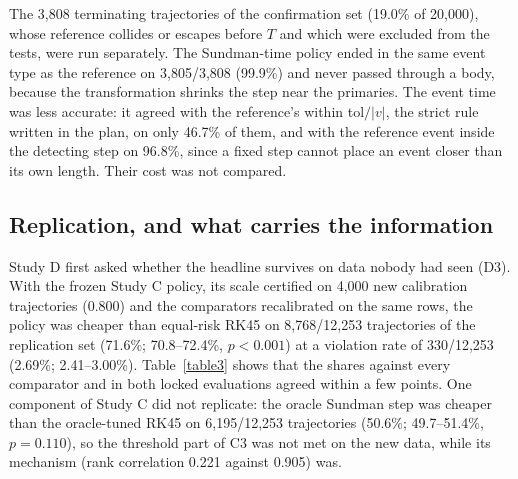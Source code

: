 \documentclass[10pt,letterpaper]{article}
\begin{document}
The 3,808 terminating trajectories of the confirmation set (19.0\% of 20,000), whose reference collides or escapes before $T$ and which were excluded from the tests, were run separately. The Sundman-time policy ended in the same event type as the reference on 3,805/3,808 (99.9\%) and never passed through a body, because the transformation shrinks the step near the primaries. The event time was less accurate: it agreed with the reference's within tol$/|v|$, the strict rule written in the plan, on only 46.7\% of them, and with the reference event inside the detecting step on 96.8\%, since a fixed step cannot place an event closer than its own length. Their cost was not compared.

\subsection*{Replication, and what carries the information}
Study D first asked whether the headline survives on data nobody had seen (D3). With the frozen Study C policy, its scale certified on 4,000 new calibration trajectories (0.800) and the comparators recalibrated on the same rows, the policy was cheaper than equal-risk RK45 on 8,768/12,253 trajectories of the replication set (71.6\%; 70.8--72.4\%, $p < 0.001$) at a violation rate of 330/12,253 (2.69\%; 2.41--3.00\%). Table~\ref{table3} shows that the shares against every comparator and in both locked evaluations agreed within a few points. One component of Study C did not replicate: the oracle Sundman step was cheaper than the oracle-tuned RK45 on 6,195/12,253 trajectories (50.6\%; 49.7--51.4\%, $p = 0.110$), so the threshold part of C3 was not met on the new data, while its mechanism (rank correlation 0.221 against 0.905) was.
\end{document}
